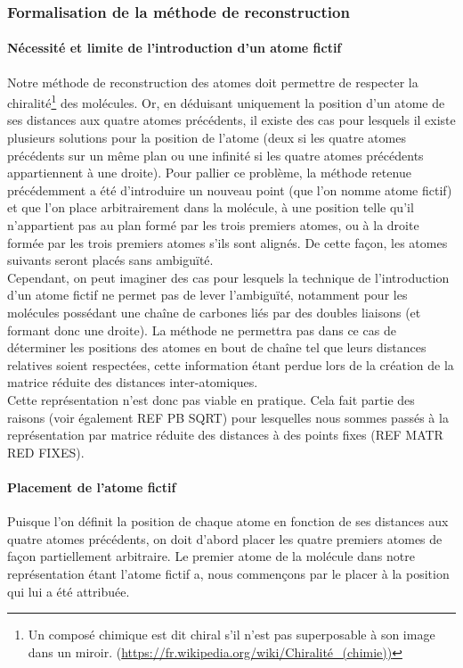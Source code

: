 \subsubsection{Formalisation de la méthode de reconstruction}

\paragraph{Nécessité et limite de l'introduction d'un atome fictif} Notre méthode de reconstruction des atomes doit permettre de respecter la chiralité\footnote{Un composé chimique est dit chiral s'il n'est pas superposable à son image dans un miroir. (\url{https://fr.wikipedia.org/wiki/Chiralité_(chimie))}} des molécules. Or, en déduisant uniquement la position d'un atome de ses distances aux quatre atomes précédents, il existe des cas pour lesquels il existe plusieurs solutions pour la position de l'atome (deux si les quatre atomes précédents sur un même plan ou une infinité si les quatre atomes précédents appartiennent à une droite). Pour pallier ce problème, la méthode retenue précédemment a été d'introduire un nouveau point (que l'on nomme atome fictif) et que l'on place arbitrairement dans la molécule, à une position telle qu'il n'appartient pas au plan formé par les trois premiers atomes, ou à la droite formée par les trois premiers atomes s'ils sont alignés. De cette façon, les atomes suivants seront placés sans ambiguïté.\\
Cependant, on peut imaginer des cas pour lesquels la technique de l'introduction d'un atome fictif ne permet pas de lever l'ambiguïté, notamment pour les molécules possédant une chaîne de carbones liés par des doubles liaisons (et formant donc une droite). La méthode ne permettra pas dans ce cas de déterminer les positions des atomes en bout de chaîne tel que leurs distances relatives soient respectées, cette information étant perdue lors de la création de la matrice réduite des distances inter-atomiques. \\
Cette représentation n'est donc pas viable en pratique. Cela fait partie des raisons (voir également REF PB SQRT) pour lesquelles nous sommes passés à la représentation par matrice réduite des distances à des points fixes (REF MATR RED FIXES).

\paragraph{Placement de l'atome fictif} Puisque l'on définit la position de chaque atome en fonction de ses distances aux quatre atomes précédents, on doit d'abord placer les quatre premiers atomes de façon partiellement arbitraire. Le premier atome de la molécule dans notre représentation étant l'atome fictif a, nous commençons par le placer à la position qui lui a été attribuée.

